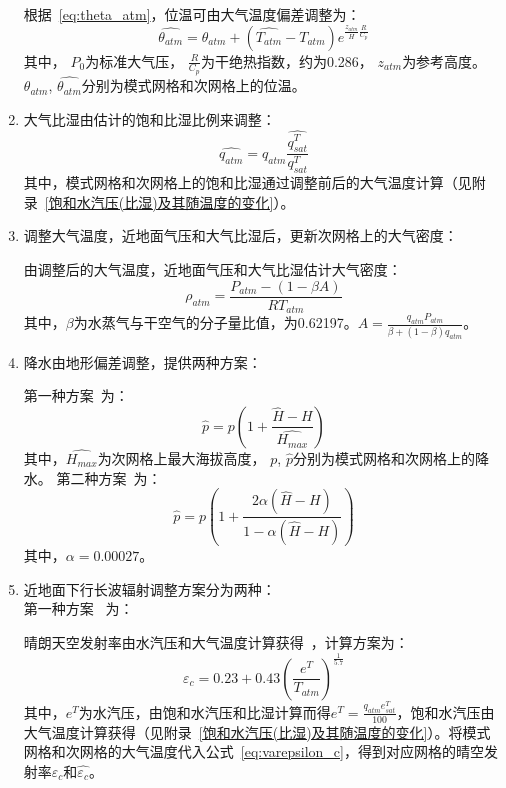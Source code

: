 \begin{enumerate}
根据~\eqref{eq:theta_atm}，位温可由大气温度偏差调整为：
\begin{equation}
\hat{\theta_{atm}}=\theta_{atm}+\left(\hat{T_{atm}}-T_{atm}\right) e^{\frac{z_{atm}}{\bar{H}} \frac{R}{C_{p}}}
\end{equation}
其中，
$P_{0}$为标准大气压，
$\frac{R}{C_{p}}$为干绝热指数，约为0.286，
$z_{atm}$为参考高度。
$\theta_{atm}$, $\hat{\theta_{atm}}$分别为模式网格和次网格上的位温。

\item 大气比湿由估计的饱和比湿比例来调整：\\
\begin{equation}
\hat{q_{atm}}=q_{atm} \frac{\hat{q_{sat}^T}}{q_{sat}^T} 
\end{equation}
其中，模式网格和次网格上的饱和比湿通过调整前后的大气温度计算（见附录~\ref{饱和水汽压(比湿)及其随温度的变化}）。

\item  调整大气温度，近地面气压和大气比湿后，更新次网格上的大气密度：

由调整后的大气温度，近地面气压和大气比湿估计大气密度：
\begin{equation}
\rho_{atm}=\frac{P_{atm}-(1-\beta A)}{R T_{atm}}
\end{equation}
其中，$\beta$为水蒸气与干空气的分子量比值，为0.62197。$A=\frac{q_{atm} P_{atm}}{\beta +(1-\beta)q_{atm}}$。

\item  降水由地形偏差调整，提供两种方案：

第一种方案~\citep{Tesfa2020}为：
\begin{equation}
\hat{p}=p \left({1+\frac{\hat{H}-H}{\hat{H_{max}}}}\right)
\end{equation}
其中，$\hat{H_{max}}$为次网格上最大海拔高度，
$p$, $\hat{p}$分别为模式网格和次网格上的降水。
第二种方案~\citep{liston2006Meteorological}为：
\begin{equation}
\hat{p}=p \left(1+\frac{2 \alpha \left(\hat{H}-H\right)}{1- \alpha \left(\hat{H}-H\right)}\right)
\end{equation}
其中，$\alpha=0.00027$。

\item 近地面下行长波辐射调整方案分为两种：\\
第一种方案~\citep{fiddes2014toposcale} 为：

晴朗天空发射率由水汽压和大气温度计算获得~\citep{konzelmann1994parameterization}，计算方案为：
\begin{equation}\label{eq:varepsilon_c}
\varepsilon_{c}=0.23+0.43 \left(\frac{e^{T}}{T_{atm}}\right)^\frac{1}{5.7}
\end{equation}
其中，$e^{T}$为水汽压，由饱和水汽压和比湿计算而得$e^{T}= \frac{q_{atm} e_{sat}^{T}}{100}$，饱和水汽压由大气温度计算获得（见附录~\ref{饱和水汽压(比湿)及其随温度的变化}）。将模式网格和次网格的大气温度代入公式~\eqref{eq:varepsilon_c}，得到对应网格的晴空发射率$\varepsilon_c$和$\hat{\varepsilon_{c}}$。


\end{enumerate}
